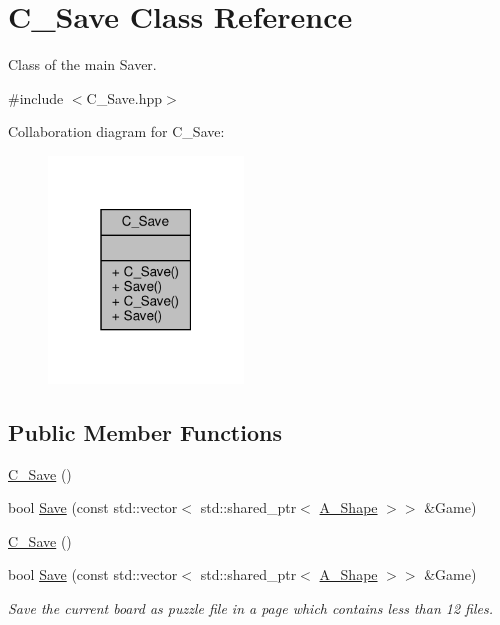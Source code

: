 \hypertarget{classC__Save}{}\section{C\+\_\+\+Save Class Reference}
\label{classC__Save}


Class of the main Saver.  




{\ttfamily \#include $<$C\+\_\+\+Save.\+hpp$>$}



Collaboration diagram for C\+\_\+\+Save\+:\nopagebreak
\begin{figure}[H]
\begin{center}
\leavevmode
\includegraphics[width=147pt]{classC__Save__coll__graph}
\end{center}
\end{figure}
\subsection*{Public Member Functions}
\begin{DoxyCompactItemize}
\item 
\hyperlink{classC__Save_adc49f753d7b0f40c95ec2b93f81b9672}{C\+\_\+\+Save} ()
\item 
bool \hyperlink{classC__Save_a144be848679b771afb9cf410710308e8}{Save} (const std\+::vector$<$ std\+::shared\+\_\+ptr$<$ \hyperlink{classA__Shape}{A\+\_\+\+Shape} $>$$>$ \&Game)
\item 
\hyperlink{classC__Save_adc49f753d7b0f40c95ec2b93f81b9672}{C\+\_\+\+Save} ()
\item 
bool \hyperlink{classC__Save_a144be848679b771afb9cf410710308e8}{Save} (const std\+::vector$<$ std\+::shared\+\_\+ptr$<$ \hyperlink{classA__Shape}{A\+\_\+\+Shape} $>$$>$ \&Game)
\begin{DoxyCompactList}\small\item\em Save the current board as puzzle file in a page which contains less than 12 files. \end{DoxyCompactList}\end{DoxyCompactItemize}


